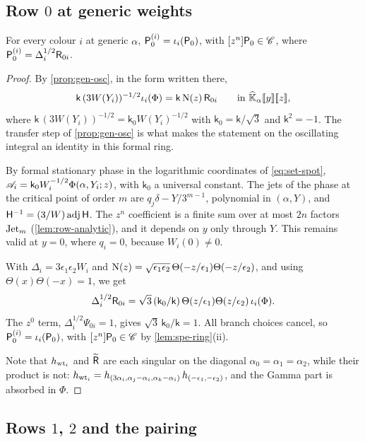 \subsection{Row \texorpdfstring{$0$}{0} at generic weights}

\begin{lem}
\label{lem:spe-row0}
For every colour $i$ at generic $\alpha$, $\mathsf{P}_0^{(i)}=\iota_i(\mathsf{P}_0)$, with $[z^n]\mathsf{P}_0\in\mathscr{C}$, where $\mathsf{P}_0^{(i)}=\Delta_i^{1/2}\mathsf{R}_{0i}$.
\end{lem}

\begin{proof}
By \cref{prop:gen-osc}, in the form written there,
\[
\mathsf{k}\,(3W(Y_i))^{-1/2}\iota_i(\Phi)=\mathsf{k}\,\mathrm{N}(z)\,\mathsf{R}_{0i}\qquad\text{in }\widehat{\mathbb{K}}_{\alpha}[\![ y ]\!][\![ z ]\!],
\]
where $\mathsf{k}\,(3W(Y_i))^{-1/2}=\mathsf{k}_0W(Y_i)^{-1/2}$ with $\mathsf{k}_0=\mathsf{k}/\sqrt3$ and $\mathsf{k}^2=-1$. The transfer step of \cref{prop:gen-osc} is what makes the statement on the oscillating integral an identity in this formal ring.

By formal stationary phase in the logarithmic coordinates of \eqref{eq:set-spot}, $\mathscr{A}_i=\mathsf{k}_0W_i^{-1/2}\Phi(\alpha,Y_i;z)$, with $\mathsf{k}_0$ a universal constant. The jets of the phase at the critical point of order $m$ are $q_j\delta-Y/3^{m-1}$, polynomial in $(\alpha,Y)$, and $\mathsf{H}^{-1}=(3/W)\,\mathrm{adj}\,\mathsf{H}$. The $z^n$ coefficient is a finite sum over at most $2n$ factors $\mathrm{Jet}_m$ (\cref{lem:row-analytic}), and it depends on $y$ only through $Y$. This remains valid at $y=0$, where $q_i=0$, because $W_i(0)\neq0$.

With $\Delta_i=3\epsilon_1\epsilon_2W_i$ and $\mathrm{N}(z)=\sqrt{\epsilon_1\epsilon_2}\,\Theta(-z/\epsilon_1)\Theta(-z/\epsilon_2)$, and using $\Theta(x)\Theta(-x)=1$, we get
\[
\Delta_i^{1/2}\mathsf{R}_{0i}=\sqrt3\,(\mathsf{k}_0/\mathsf{k})\,\Theta(z/\epsilon_1)\Theta(z/\epsilon_2)\,\iota_i(\Phi).
\]
The $z^0$ term, $\Delta_i^{1/2}\Psi_{0i}=1$, gives $\sqrt3\,\mathsf{k}_0/\mathsf{k}=1$. All branch choices cancel, so $\mathsf{P}_0^{(i)}=\iota_i(\mathsf{P}_0)$, with $[z^n]\mathsf{P}_0\in\mathscr{C}$ by \cref{lem:spe-ring}(ii).

Note that $h_{\mathrm{wt}_i}$ and $\widetilde{\mathsf{R}}$ are each singular on the diagonal $\alpha_0=\alpha_1=\alpha_2$, while their product is not: $h_{\mathrm{wt}_i}=h_{(3\alpha_i,\alpha_j-\alpha_i,\alpha_k-\alpha_i)}\,h_{(-\epsilon_1,-\epsilon_2)}$, and the Gamma part is absorbed in $\Phi$.
\end{proof}

\subsection{Rows \texorpdfstring{$1$}{1}, \texorpdfstring{$2$}{2} and the pairing}

